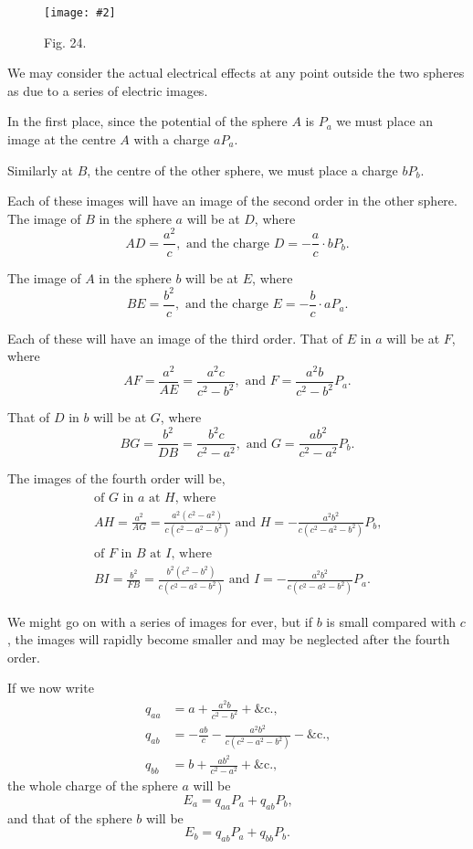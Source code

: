 \documentclass[12pt,oneside]{book}[2021/10/04]
\newcommand{\Runhead}[1]{\fancyhead[C]{\iffloatpage{}{\small#1}}}
\newcommand{\widefig}[3]{
\begin{figure}[ht!]
\centering
\texttt{[image: \#2]}
\caption*{\small #3}
\end{figure}}
\newcommand{\¬}{\hphantom{0}}
\begin{document}
\widefig{.95}{102.png}{Fig. 24.}
We may consider the actual electrical effects at any point outside
the two spheres as due to a series of electric images.

In the first place, since the potential of the sphere \(A\) is \(P_a\) we
must place an image at the centre \(A\) with a charge \(aP_a\).
\Runhead{TWO SPHERES.}

Similarly at \(B\), the centre of the other sphere, we must place a
charge \(bP_b\).

Each of these images will have an image of the second order in
the other sphere. The image of \(B\) in the sphere \(a\) will be at \(D\),
where
\[
AD = \frac{a^2}{c}, \text{ and the charge } D = -\frac{a}{c} \cdot bP_b\text{.}
\]

The image of \(A\) in the sphere \(b\) will be at \(E\), where
\[
BE = \frac{b^2}{c}, \text{ and the charge } E = -\frac{b}{c} \cdot aP_a\text{.}
\]

Each of these will have an image of the third order. That of \(E\)
in \(a\) will be at \(F\), where
\[AF = \frac{a^2}{AE} = \frac{a^2 c}{c^2 - b^2}, \text{ and } F = \frac{a^2 b}{c^2 - b^2} P_a\text{.}\]

That of \(D\) in \(b\) will be at \(G\), where
\[
BG = \frac{b^2}{DB} = \frac{b^2 c}{c^2 - a^2}, \text{ and } G = \frac{ab^2}{c^2 - a^2} P_b\text{.}\]

The images of the fourth order will be,
\begin{gather*}
\begin{multlined}
\text{of \(G\) in \(a\) at \(H\), where}\\
AH = \frac{a^2}{AG} = \frac{a^2 (c^2 - a^2)}{c (c^2 - a^2 - b^2)} \text{ and } H = - \frac{a^2 b^2}{c (c^2 - a^2 - b^2)} P_b\text{,}
\end{multlined}\\
\begin{multlined}
\text{of \(F\) in \(B\) at \(I\), where}\\
BI = \frac{b^2}{FB} = \frac{b^2 (c^2 - b^2)}{c (c^2 - a^2 - b^2)} \text{ and } I = - \frac{a^2 b^2}{c (c^2 - a^2 - b^2)} P_a\text{.}
\end{multlined}
\end{gather*}

We might go on with a series of images for ever, but if \(b\) is small
compared with \(c\), the images will rapidly become smaller and may
be neglected after the fourth order.

If we now write
\begin{align*}
q_{aa} &= a + \frac{a^2 b}{c^2 - b^2} + \text{\&c.,}\\
q_{ab} &= - \frac{ab}{c} - \frac{a^2 b^2}{c (c^2 - a^2 - b^2)} - \text{\&c.,}\\
q_{bb} &= b + \frac{ab^2}{c^2 -a^2} + \text{\&c.,}
\end{align*}
the whole charge of the sphere \(a\) will be
\[E_a = q_{aa} P_a + q_{ab} P_b\text{,}\]
and that of the sphere \(b\) will be
\[E_b = q_{ab} P_a + q_{bb} P_b\text{.}\]
\end{document}
